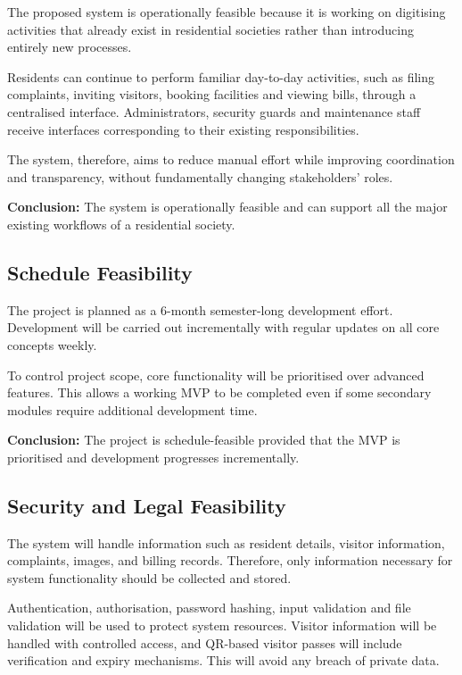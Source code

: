 \documentclass[11pt,a4paper]{article}
\begin{document}
The proposed system is operationally feasible because it is working on digitising activities that already exist in residential societies rather than introducing entirely new processes.

Residents can continue to perform familiar day-to-day activities, such as filing complaints, inviting visitors, booking facilities and viewing bills, through a centralised interface. Administrators, security guards and maintenance staff receive interfaces corresponding to their existing responsibilities.

The system, therefore, aims to reduce manual effort while improving coordination and transparency, without fundamentally changing stakeholders' roles.

\textbf{Conclusion:} The system is operationally feasible and can support all the major existing workflows of a residential society.

\subsection{Schedule Feasibility}

The project is planned as a 6-month semester-long development effort. Development will be carried out incrementally with regular updates on all core concepts weekly.

To control project scope, core functionality will be prioritised over advanced features. This allows a working MVP to be completed even if some secondary modules require additional development time.

\textbf{Conclusion:} The project is schedule-feasible provided that the MVP is prioritised and development progresses incrementally.

\subsection{Security and Legal Feasibility}

The system will handle information such as resident details, visitor information, complaints, images, and billing records. Therefore, only information necessary for system functionality should be collected and stored.

Authentication, authorisation, password hashing, input validation and file validation will be used to protect system resources. Visitor information will be handled with controlled access, and QR-based visitor passes will include verification and expiry mechanisms. This will avoid any breach of private data.
\end{document}
